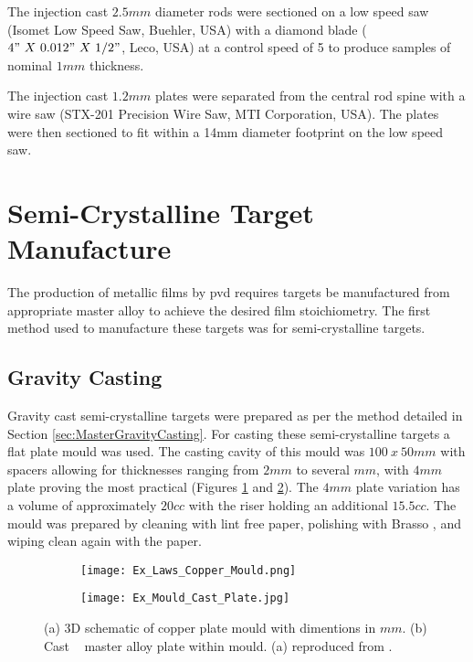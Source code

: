 \documentclass[a4paper,12pt,oneside]{report}%
\begin{document}
The injection cast $2.5mm$ diameter rods were sectioned on a low speed saw (Isomet Low Speed Saw, Buehler, USA) with a diamond blade ($4"~ X~ 0.012"~ X~ 1/2"$, Leco, USA) at a control speed of 5 to produce samples of nominal $1mm$ thickness. 

The injection cast $1.2mm$ plates were separated from the central rod spine with a wire saw (STX-201 Precision Wire Saw, MTI Corporation, USA). The plates were then sectioned to fit within a 14mm diameter footprint on the low speed saw. 

\section{Semi-Crystalline Target Manufacture} 
The production of metallic films by \gls{pvd} requires targets be manufactured from appropriate master alloy to achieve the desired film stoichiometry. The first method used to manufacture these targets was for semi-crystalline targets.

\subsection{Gravity Casting}
Gravity cast semi-crystalline targets were prepared as per the method detailed in Section \ref{sec:MasterGravityCasting}. For casting these semi-crystalline targets a flat plate mould was used. The casting cavity of this mould was $100~ x~ 50 mm$ with spacers allowing for thicknesses ranging from $2 mm$ to several $mm$, with $4 mm$ plate proving the most practical (Figures \ref{fig:LawsMould} and \ref{fig:FilledMould}). The $4 mm$ plate variation has a volume of approximately $20 cc$ with the riser holding an additional $15.5 cc$. The mould was prepared by cleaning with lint free paper, polishing with Brasso \textcopyright, and wiping clean again with the paper.

\begin{figure}[htbp]
	\begin{subfigure}[htbp]{0.41\textwidth}
		\texttt{[image: Ex\_Laws\_Copper\_Mould.png]}
		\caption{}
		\label{fig:LawsMould}
	\end{subfigure}
	\begin{subfigure}[htbp]{0.49\textwidth}
		\texttt{[image: Ex\_Mould\_Cast\_Plate.jpg]}
		\caption{}
		\label{fig:FilledMould}
	\end{subfigure}
	\caption[(a) 3D schematic of copper plate mould with dimentions in $mm$. (b) Cast \MgZnCa~ master alloy plate within mould.]{(a) 3D schematic of copper plate mould with dimentions in $mm$. (b) Cast \MgZnCa~ master alloy plate within mould. (a) reproduced from \cite{Laws2007}.}%
	\label{fig:PlateMould}
\end{figure}
\end{document}
